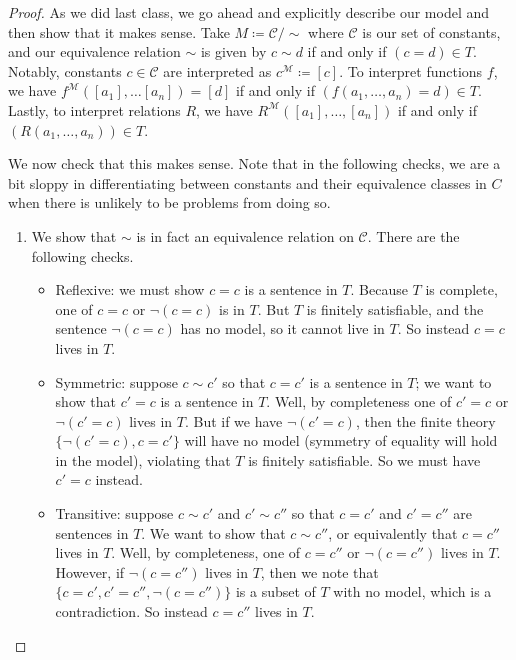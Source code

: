 \documentclass[../notes.tex]{subfiles}
\begin{document}
\begin{proof}
	As we did last class, we go ahead and explicitly describe our model and then show that it makes sense. Take $M\coloneqq\mathcal C/{\sim}$ where $\mathcal C$ is our set of constants, and our equivalence relation $\sim$ is given by $c\sim d$ if and only if $(c=d)\in T$. Notably, constants $c\in\mathcal C$ are interpreted as $c^\mathcal M\coloneqq[c]$. To interpret functions $f$, we have $f^\mathcal M([a_1],\ldots[a_n])=[d]$ if and only if $(f(a_1,\ldots,a_n)=d)\in T$. Lastly, to interpret relations $R$, we have $R^\mathcal M([a_1],\ldots,[a_n])$ if and only if $(R(a_1,\ldots,a_n))\in T$.

	We now check that this makes sense. Note that in the following checks, we are a bit sloppy in differentiating between constants and their equivalence classes in $C$ when there is unlikely to be problems from doing so.
	\begin{enumerate}
		\item We show that $\sim$ is in fact an equivalence relation on $\mathcal C$. There are the following checks.
		\begin{itemize}
			\item Reflexive: we must show $c=c$ is a sentence in $T$. Because $T$ is complete, one of $c=c$ or $\lnot(c=c)$ is in $T$. But $T$ is finitely satisfiable, and the sentence $\lnot(c=c)$ has no model, so it cannot live in $T$. So instead $c=c$ lives in $T$.
			\item Symmetric: suppose $c\sim c'$ so that $c=c'$ is a sentence in $T$; we want to show that $c'=c$ is a sentence in $T$. Well, by completeness one of $c'=c$ or $\lnot(c'=c)$ lives in $T$. But if we have $\lnot(c'=c)$, then the finite theory $\{\lnot(c'=c),c=c'\}$ will have no model (symmetry of equality will hold in the model), violating that $T$ is finitely satisfiable. So we must have $c'=c$ instead.
			\item Transitive: suppose $c\sim c'$ and $c'\sim c''$ so that $c=c'$ and $c'=c''$ are sentences in $T$. We want to show that $c\sim c''$, or equivalently that $c=c''$ lives in $T$. Well, by completeness, one of $c=c''$ or $\lnot(c=c'')$ lives in $T$. However, if $\lnot(c=c'')$ lives in $T$, then we note that $\{c=c',c'=c'',\lnot(c=c'')\}$ is a subset of $T$ with no model, which is a contradiction. So instead $c=c''$ lives in $T$.
		\end{itemize}


\end{enumerate}
\end{proof}
\end{document}
